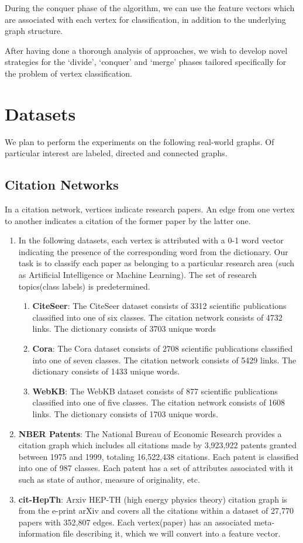 \documentclass{article}
\begin{document}
During the conquer phase of the algorithm, we can use the feature vectors which are associated with each vertex for classification, in addition to the underlying graph structure.

After having done a thorough analysis of approaches, we wish to develop novel strategies for the ‘divide’, ‘conquer’ and ‘merge’ phases tailored specifically for the problem of vertex classification.  

\section*{Datasets}
We plan to perform the experiments on the following real-world graphs. Of particular interest are labeled, directed and connected graphs.

\subsection*{Citation Networks}
 In a citation network, vertices indicate research papers. An edge from one vertex to another indicates a citation of the former paper by the latter one.

\begin{enumerate}
\item In the following datasets, each vertex is attributed with a 0-1 word vector indicating the presence of the corresponding word from the dictionary. Our task is to classify each paper as belonging to a particular research area (such as Artificial Intelligence or Machine Learning). The set of research topics(class labels) is predetermined.
\begin{enumerate}
\item \textbf{CiteSeer}: The CiteSeer dataset consists of 3312 scientific publications classified into one of six classes. The citation network consists of 4732 links. The dictionary consists of 3703 unique words
\item \textbf {Cora}: The Cora dataset consists of 2708 scientific publications classified into one of seven classes. The citation network consists of 5429 links. The dictionary consists of 1433 unique words. 
\item \textbf{WebKB}: The WebKB dataset consists of 877 scientific publications classified into one of five classes. The citation network consists of 1608 links. The dictionary consists of 1703 unique words.
\end{enumerate}
\item \textbf{NBER Patents}: The National Bureau of Economic Research provides a citation graph which includes all citations made by 3,923,922 patents granted between 1975 and 1999, totaling 16,522,438 citations. Each patent is classified into one of 987 classes. Each patent has a set of attributes associated with it such as state of author, measure of originality, etc.
\item \textbf{cit-HepTh}: Arxiv HEP-TH (high energy physics theory) citation graph is from the e-print arXiv and covers all the citations within a dataset of 27,770 papers with 352,807 edges. Each vertex(paper) has an associated meta-information file describing it, which we will convert into a feature vector.
\end{enumerate}   
\end{document}
